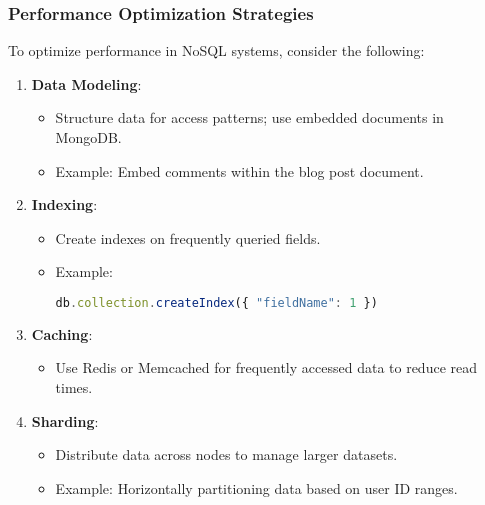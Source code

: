 \documentclass[aspectratio=169]{beamer}
\begin{document}
\begin{frame}[fragile]
  \frametitle{Performance Optimization Strategies}
  To optimize performance in NoSQL systems, consider the following:
  \begin{enumerate}
    \item \textbf{Data Modeling}:
      \begin{itemize}
        \item Structure data for access patterns; use embedded documents in MongoDB.
        \item Example: Embed comments within the blog post document.
      \end{itemize}
      
    \item \textbf{Indexing}:
      \begin{itemize}
        \item Create indexes on frequently queried fields.
        \item Example:
        \begin{lstlisting}[language=javascript]
db.collection.createIndex({ "fieldName": 1 })
        \end{lstlisting}
      \end{itemize}
      
    \item \textbf{Caching}:
      \begin{itemize}
        \item Use Redis or Memcached for frequently accessed data to reduce read times.
      \end{itemize}
      
    \item \textbf{Sharding}:
      \begin{itemize}
        \item Distribute data across nodes to manage larger datasets.
        \item Example: Horizontally partitioning data based on user ID ranges.
      \end{itemize}
  \end{enumerate}
\end{frame}
\end{document}
